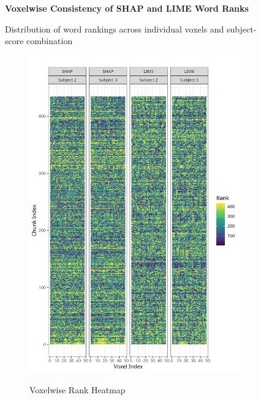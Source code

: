 \documentclass[10pt,letterpaper]{article}
\begin{document}
\begin{figure}[ht]
    \centering

    \parbox{\textwidth}{\centering 
        \fontsize{13pt}{13pt}\selectfont \textbf{Voxelwise Consistency of SHAP and LIME Word Ranks}  
        
        {\fontsize{11pt}{13pt}\selectfont Distribution of word rankings across individual voxels and subject-score combination} 
    }
    
    \begin{subfigure}[t]{0.35\textwidth}
        \centering
        \caption{Voxelwise Rank Heatmap}
        \includegraphics[width=\textwidth]{figs/heatmap_laws.png}
        \label{subfig:heatmap_laws}
    \end{subfigure}
    \hfill
    \begin{subfigure}[t]{0.35\textwidth}

\end{subfigure}
\end{figure}
\end{document}
